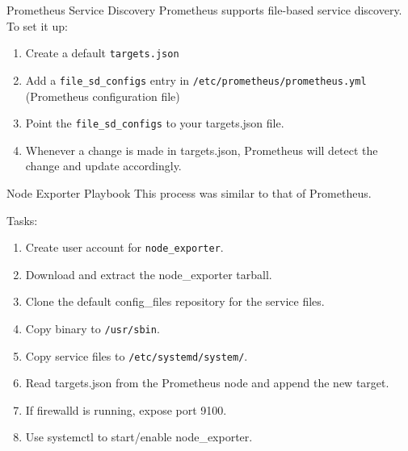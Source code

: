 \documentclass[14pt,compress,usenames,dvipsnames,aspectratio=169]{beamer}
\begin{document}
\begin{frame}{Prometheus Service Discovery}
    Prometheus supports file-based service discovery.  
    To set it up:
    \begin{enumerate}
        \item{Create a default \texttt{targets.json}} 
        \item{Add a \texttt{file\_sd\_configs} entry in \texttt{/etc/prometheus/prometheus.yml}
            (Prometheus configuration file)} 
        \item{Point the \texttt{file\_sd\_configs} to your targets.json file.} 
        \item{Whenever a change is made in targets.json, Prometheus will detect the
            change and update accordingly.}
    \end{enumerate}
\end{frame}



\begin{frame}{Node Exporter Playbook}
    This process was similar to that of Prometheus.  

    Tasks:
    \begin{enumerate}
        \item{Create user account for \texttt{node\_exporter}.} 
        \item{Download and extract the node\_exporter tarball.} 
        \item{Clone the default config\_files repository for the service files.} 
        \item{Copy binary to \texttt{/usr/sbin}.} 
        \item{Copy service files to \texttt{/etc/systemd/system/}. } 
        \item{Read targets.json from the Prometheus node and append the new target.} 
        \item{If firewalld is running, expose port 9100. } 
        \item{Use systemctl to start/enable node\_exporter.} 
    \end{enumerate}
\end{frame}
\end{document}
